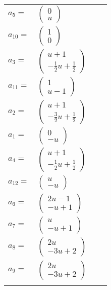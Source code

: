 \documentclass[1p]{elsarticle_modified}
\theoremstyle{definition}
\begin{document}
\begin{tabular}{m{7pt} m{180pt} m{7pt} m{180pt} }
\flushright $a_{5}=$&$\begin{pmatrix}0\\u\end{pmatrix}$ \\
\flushright $a_{10}=$&$\begin{pmatrix}1\\0\end{pmatrix}$ \\
\flushright $a_{3}=$&$\begin{pmatrix}u+1\\-\frac{1}{2} u+\frac{1}{2}\end{pmatrix}$ \\
\flushright $a_{11}=$&$\begin{pmatrix}1\\u-1\end{pmatrix}$ \\
\flushright $a_{2}=$&$\begin{pmatrix}u+1\\-\frac{3}{2} u+\frac{1}{2}\end{pmatrix}$ \\
\flushright $a_{1}=$&$\begin{pmatrix}0\\- u\end{pmatrix}$ \\
\flushright $a_{4}=$&$\begin{pmatrix}u+1\\-\frac{1}{2} u+\frac{1}{2}\end{pmatrix}$ \\
\flushright $a_{12}=$&$\begin{pmatrix}u\\- u\end{pmatrix}$ \\
\flushright $a_{6}=$&$\begin{pmatrix}2 u-1\\- u+1\end{pmatrix}$ \\
\flushright $a_{7}=$&$\begin{pmatrix}u\\- u+1\end{pmatrix}$ \\
\flushright $a_{8}=$&$\begin{pmatrix}2 u\\-3 u+2\end{pmatrix}$ \\
\flushright $a_{9}=$&$\begin{pmatrix}2 u\\-3 u+2\end{pmatrix}$\\&\end{tabular}
\end{document}
